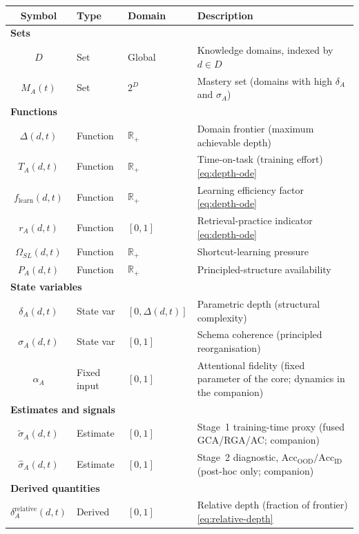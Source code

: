 \documentclass{article}
\theoremstyle{definition}
\newcommand{\R}{\mathbb{R}}
\begin{document}
\begin{center}
\footnotesize
\setlength{\tabcolsep}{4pt}
\begin{tabular}{c l l >{\raggedright\arraybackslash}p{4.2cm}}
\toprule
\textbf{Symbol} & \textbf{Type} & \textbf{Domain} & \textbf{Description} \\
\midrule
\multicolumn{4}{l}{\textbf{Sets}} \\
$D$ & Set & Global & Knowledge domains, indexed by $d \in D$ \\
$M_A(t)$ & Set & $2^D$ & Mastery set (domains with high $\delta_A$ and $\sigma_A$) \\
\multicolumn{4}{l}{\textbf{Functions}} \\
$\Delta(d,t)$ & Function & $\R_+$ & Domain frontier (maximum achievable depth) \\
$T_A(d,t)$ & Function & $\R_+$ & Time-on-task (training effort) \hfill\eqref{eq:depth-ode} \\
$f_{\text{learn}}(d,t)$ & Function & $\R_+$ & Learning efficiency factor \hfill\eqref{eq:depth-ode} \\
$r_A(d,t)$ & Function & $[0,1]$ & Retrieval-practice indicator \hfill\eqref{eq:depth-ode} \\
$\Omega_{SL}(d,t)$ & Function & $\R_+$ & Shortcut-learning pressure \\
$P_A(d,t)$ & Function & $\R_+$ & Principled-structure availability \\
\multicolumn{4}{l}{\textbf{State variables}} \\
$\delta_A(d,t)$ & State var & $[0, \Delta(d,t)]$ & Parametric depth (structural complexity) \\
$\sigma_A(d,t)$ & State var & $[0,1]$ & Schema coherence (principled reorganisation) \\
$\alpha_A$ & Fixed input & $[0,1]$ & Attentional fidelity (fixed parameter of the core; dynamics in the companion) \\
\multicolumn{4}{l}{\textbf{Estimates and signals}} \\
$\tilde{\sigma}_A(d,t)$ & Estimate & $[0,1]$ & Stage~1 training-time proxy (fused GCA/RGA/AC; companion) \\
$\hat{\sigma}_A(d,t)$ & Estimate & $[0,1]$ & Stage~2 diagnostic, $\text{Acc}_{\text{OOD}}/\text{Acc}_{\text{ID}}$ (post-hoc only; companion) \\
\multicolumn{4}{l}{\textbf{Derived quantities}} \\
$\delta_A^{\text{relative}}(d,t)$ & Derived & $[0,1]$ & Relative depth (fraction of frontier) \hfill\eqref{eq:relative-depth} \\

\end{tabular}
\end{center}
\end{document}
